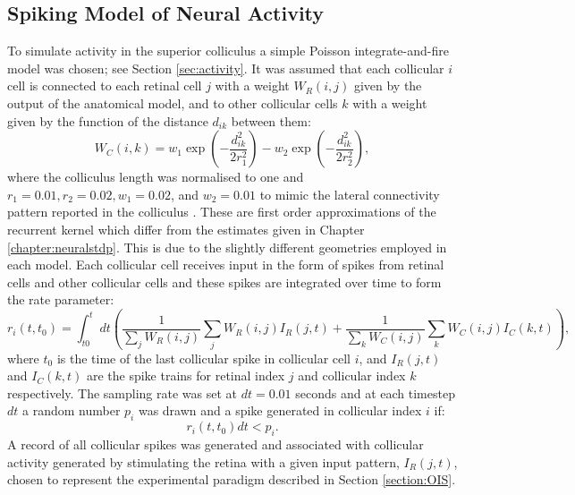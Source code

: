 \subsection{Spiking Model of Neural Activity}
To simulate activity in the superior colliculus a simple Poisson integrate-and-fire model was chosen; see Section \ref{sec:activity}. It was assumed that each collicular $i$ cell is connected to each retinal cell $j$ with a weight $W_R(i,j)$ given by the output of the anatomical model, and to other collicular cells $k$ with a weight given by the function of the distance $d_{ik}$ between them:
\begin{equation}
W_C(i, k) = w_1 \exp\left(-\frac{d_{ik}^2}{2r_1^2}\right) -w_2 \exp\left(-\frac{d_{ik}^2}{2r_2^2}\right),
\end{equation}
where the colliculus length was normalised to one and $r_1 = 0.01, r_2 = 0.02, w_1 = 0.02$, and $w_2 = 0.01$ to mimic the lateral connectivity pattern reported in the colliculus \cite{Phongphanphanee2014-in}. These are first order approximations of the recurrent kernel which differ from the estimates given in Chapter \ref{chapter:neuralstdp}. This is due to the slightly different geometries employed in each model. Each collicular cell receives input in the form of spikes from retinal cells and other collicular cells and these spikes are integrated over time to form the rate parameter:
\begin{equation}
r_i(t, t_0) = \int_{t0}^t dt \left( \frac{1}{\sum_jW_R(i,j)}\sum_{j} W_R(i,j) I_R(j, t) + \frac{1}{\sum_kW_C(i,j)}\sum_{k} W_C(i,j) I_C(k, t) \right),
\end{equation} 
where $t_0$ is the time of the last collicular spike in collicular cell $i$, and $I_R(j,t)$ and $I_C(k, t)$ are the spike trains for retinal index $j$ and collicular index $k$ respectively. The sampling rate was set at $dt = 0.01$ seconds and at each timestep $dt$ a random number $p_i$ was drawn and a spike generated in collicular index $i$ if:
\begin{equation}
r_i(t, t_0) dt < p_i.
\end{equation}
A record of all collicular spikes was generated and associated with collicular activity generated by stimulating the retina with a given input pattern, $I_R(j, t)$, chosen to represent the experimental paradigm described in Section \ref{section:OIS}. 
\newpage

